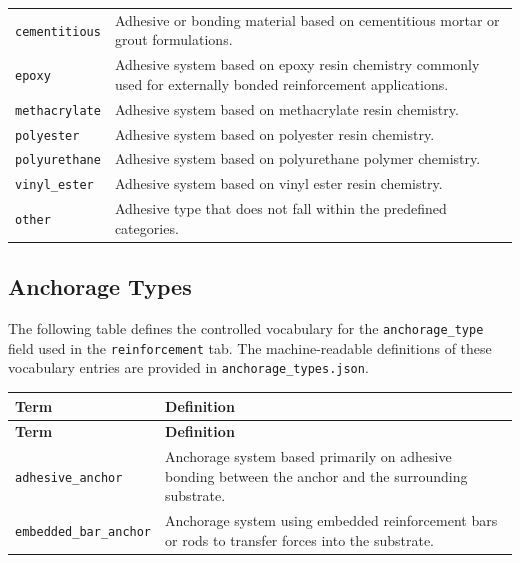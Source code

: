 \documentclass[11pt]{book}
\begin{document}
{\begin{longtable}{p{}p{}}
\texttt{cementitious} &
Adhesive or bonding material based on cementitious mortar or grout formulations. \\

\texttt{epoxy} &
Adhesive system based on epoxy resin chemistry commonly used for externally bonded reinforcement applications. \\

\texttt{methacrylate} &
Adhesive system based on methacrylate resin chemistry. \\

\texttt{polyester} &
Adhesive system based on polyester resin chemistry. \\

\texttt{polyurethane} &
Adhesive system based on polyurethane polymer chemistry. \\

\texttt{vinyl\_ester} &
Adhesive system based on vinyl ester resin chemistry. \\

\texttt{other} &
Adhesive type that does not fall within the predefined categories. \\

\hline
\end{longtable}

\subsection{Anchorage Types}
\label{vocab:anchorage_type_list}

The following table defines the controlled vocabulary for the \texttt{anchorage\_type} field used in the \texttt{reinforcement} tab. The machine-readable definitions of these vocabulary entries are provided in \texttt{anchorage\_types.json}.

\begin{longtable}{p{}p{}}
\hline
\textbf{Term} & \textbf{Definition} \\
\hline
\endfirsthead

\hline
\textbf{Term} & \textbf{Definition} \\
\hline
\endhead

\texttt{adhesive\_anchor} &
Anchorage system based primarily on adhesive bonding between the anchor and the surrounding substrate. \\

\texttt{embedded\_bar\_anchor} &
Anchorage system using embedded reinforcement bars or rods to transfer forces into the substrate. \\


\end{longtable}}
\end{document}
